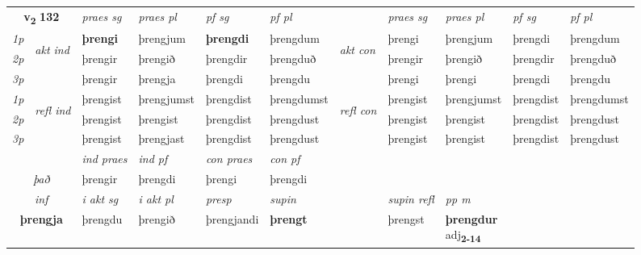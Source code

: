 \noindent
\begin{tabular}{lllllllllll} \toprule
\multicolumn{2}{c}{\textbf{v{\textsubscript{2}}} \Large{\textbf{132}}}  &  \textit{praes sg}  & \textit{praes pl}  &\textit{ pf sg} & \textit{pf pl} &  &  \textit{praes sg}  & \textit{praes pl}  & \textit{pf sg} & \textit{pf pl } \\*
	\cmidrule{3-6} \cmidrule{8-11}
 {\textit{1p}} & \multirow{3}{*}{\begin{turn}{90}\textit{akt ind}\end{turn}} & \textbf{þrengi} & þrengjum & \textbf{þrengdi} & þrengdum & \multirow{3}{*}{\begin{turn}{90}\textit{akt con}\end{turn}} &þrengi & þrengjum & þrengdi & þrengdum\\*
 {\textit{2p}} &  &  þrengir  & þrengið & þrengdir & þrengduð & & þrengir & þrengið & þrengdir & þrengduð \\*
{\textit{3p}} &  & þrengir & þrengja & þrengdi & þrengdu & & þrengi & þrengi& þrengdi & þrengdu \\*
\cmidrule{3-6} \cmidrule{8-11}
 {\textit{1p}} & \multirow{3}{*}{\begin{turn}{90}\textit{refl ind}\end{turn}}  & þrengist & þrengjumst & þrengdist & þrengdumst & \multirow{3}{*}{\begin{turn}{90}\textit{refl con}\end{turn}}  &þrengist & þrengjumst & þrengdist & þrengdumst \\*
 {\textit{2p}} &  & þrengist & þrengist & þrengdist & þrengdust & &þrengist & þrengist & þrengdist & þrengdust \\*
 {\textit{3p}}  & & þrengist & þrengjast & þrengdist & þrengdust & & þrengist & þrengist& þrengdist & þrengdust \\*
\cmidrule{3-6} \cmidrule{8-11}

   & &  \textit{ind praes} & \textit{ind pf} & \textit{con praes} & \textit{con pf} \\*
\multicolumn{2}{c}{ \textit{það} } & þrengir & þrengdi & þrengi & þrengdi \\*

\cmidrule{3-9}
   \multicolumn{2}{c}{\textit{inf}}  & \textit{i akt sg} & \textit{i akt pl}   & \textit{presp} & \textit{supin} && \textit{supin refl} & \textit{pp m} \\*
  \multicolumn{2}{c}{\textbf{þrengja}} & þrengdu  & þrengið   & þrengjandi &  \textbf{þrengt} && þrengst & \specialcell{\textbf{þrengdur} \\ adj\textbf{\textsubscript{2-14}}} \\*
\end{tabular}


